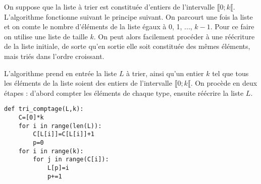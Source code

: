 On suppose que la liste à trier est constituée d’entiers de l’intervalle  $\llbracket 0; k \llbracket$. L’algorithme
fonctionne suivant le principe suivant. On parcourt une fois la liste et on comte  le nombre d’éléments de
la liste égaux à 0, 1, ..., $k-1$. Pour ce faire on utilise une liste de taille $k$. On peut alors facilement procéder à une
réécriture de la liste initiale, de sorte qu’en sortie elle soit constituée des mêmes éléments, mais triés dans l’ordre
croissant.


L’algorithme prend en entrée la liste $L$ à trier, ainsi qu’un entier $k$ tel que tous les éléments de la
liste soient des entiers de l’intervalle $\llbracket 0; k \llbracket$. On procède en deux étapes : d’abord compter les éléments de chaque type,
ensuite réécrire la liste $L$.

\begin{lstlisting}
def tri_comptage(L,k):
    C=[0]*k
    for i in range(len(L)):
        C[L[i]]=C[L[i]]+1
        p=0
    for i in range(k):
        for j in range(C[i]):
            L[p]=i
            p+=1
\end{lstlisting}